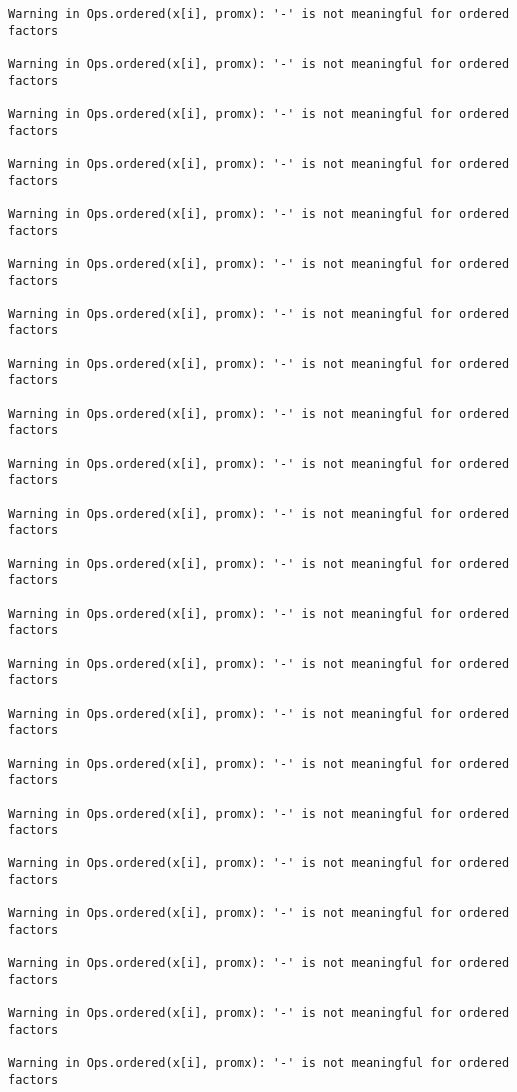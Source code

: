 \documentclass[]{article}
\begin{document}
\begin{verbatim}
Warning in Ops.ordered(x[i], promx): '-' is not meaningful for ordered
factors

Warning in Ops.ordered(x[i], promx): '-' is not meaningful for ordered
factors

Warning in Ops.ordered(x[i], promx): '-' is not meaningful for ordered
factors

Warning in Ops.ordered(x[i], promx): '-' is not meaningful for ordered
factors

Warning in Ops.ordered(x[i], promx): '-' is not meaningful for ordered
factors

Warning in Ops.ordered(x[i], promx): '-' is not meaningful for ordered
factors

Warning in Ops.ordered(x[i], promx): '-' is not meaningful for ordered
factors

Warning in Ops.ordered(x[i], promx): '-' is not meaningful for ordered
factors

Warning in Ops.ordered(x[i], promx): '-' is not meaningful for ordered
factors

Warning in Ops.ordered(x[i], promx): '-' is not meaningful for ordered
factors

Warning in Ops.ordered(x[i], promx): '-' is not meaningful for ordered
factors

Warning in Ops.ordered(x[i], promx): '-' is not meaningful for ordered
factors

Warning in Ops.ordered(x[i], promx): '-' is not meaningful for ordered
factors

Warning in Ops.ordered(x[i], promx): '-' is not meaningful for ordered
factors

Warning in Ops.ordered(x[i], promx): '-' is not meaningful for ordered
factors

Warning in Ops.ordered(x[i], promx): '-' is not meaningful for ordered
factors

Warning in Ops.ordered(x[i], promx): '-' is not meaningful for ordered
factors

Warning in Ops.ordered(x[i], promx): '-' is not meaningful for ordered
factors

Warning in Ops.ordered(x[i], promx): '-' is not meaningful for ordered
factors

Warning in Ops.ordered(x[i], promx): '-' is not meaningful for ordered
factors

Warning in Ops.ordered(x[i], promx): '-' is not meaningful for ordered
factors

Warning in Ops.ordered(x[i], promx): '-' is not meaningful for ordered
factors


\end{verbatim}
\end{document}
